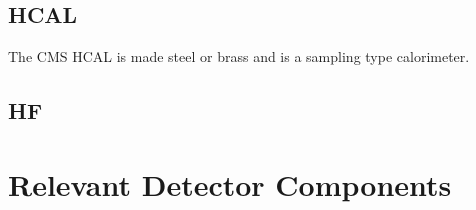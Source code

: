 \subsection{HCAL}

The CMS HCAL is made steel or brass and is a sampling type calorimeter. 

\subsection{HF}

\section{Relevant Detector Components}



